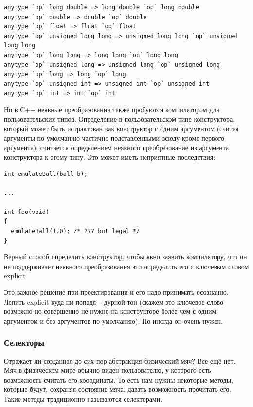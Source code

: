 \documentclass[a4paper,12pt,oneside]{article}
\begin{document}
\begin{lstlisting}
anytype `op` long double => long double `op` long double
anytype `op` double => double `op` double
anytype `op` float => float `op` float
anytype `op` unsigned long long => unsigned long long `op` unsigned long long
anytype `op` long long => long long `op` long long
anytype `op` unsigned long => unsigned long `op` unsigned long
anytype `op` long => long `op` long
anytype `op` unsigned int => unsigned int `op` unsigned int
anytype `op` int => int `op` int
\end{lstlisting}

Но в C++ неявные преобразования также пробуются компилятором для пользовательских типов. Определение в пользовательском типе конструктора, который может быть истрактован как конструктор с одним аргументом (считая аргументы по умолчанию частично подставленными всюду кроме первого аргумента), считается определением неявного преобразование из аргумента конструктора к этому типу. Это может иметь неприятные последствия:

\begin{lstlisting}
int emulateBall(ball b);

...

int foo(void)
{
  emulateBall(1.0); /* ??? but legal */
}

\end{lstlisting}

Верный способ определить конструктор, чтобы явно заявить компилятору, что он не поддерживает неявного преобразования это определить его с ключевым словом explicit



Это важное решение при проектировании и его надо принимать осознанно. Лепить explicit куда ни попадя -- дурной тон (скажем это ключевое слово возможно но совершенно не нужно на конструкторе более чем с одним аргументом и без аргументов по умолчанию). Но иногда он очень нужен.

\subsubsection{Селекторы}

Отражает ли созданная до сих пор абстракция физический мяч? Всё ещё нет. Мяч в физическом мире обычно виден пользователю, у которого есть возможность считать его координаты. То есть нам нужны некоторые методы, которые будут, сохраняя состояние мяча, давать возможность прочитать его. Такие методы традиционно называются селекторами.
\end{document}

